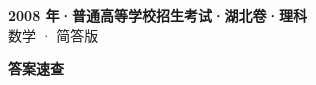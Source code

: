 \documentclass[zihao=-4, a4paper]{ctexart}
\begin{document}
\begin{center}
  {\Large\bfseries 2008 年·普通高等学校招生考试·湖北卷·理科}\\[4pt]
  {\large 数学 · 简答版}
\end{center}
\medskip
{}

\clearpage
{}
\begin{center}{\Large\bfseries 答案速查}\end{center}
\medskip

\end{document}

